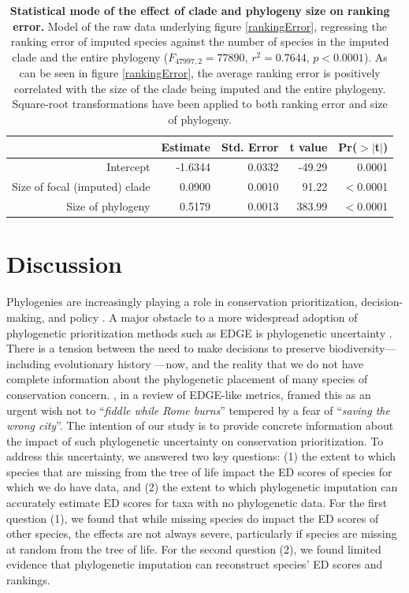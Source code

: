 \documentclass[10pt,english]{article}
\begin{document}
\begin{table}[ht]
  \centering
  \begin{tabular}{rrrrr}
    \hline
   & Estimate & Std. Error & t value & Pr($>$$|$t$|$) \\ \hline
    Intercept & -1.6344 & 0.0332 & -49.29 & 0.0001 \\
    Size of focal (imputed) clade & 0.0900 & 0.0010 & 91.22 & $<$0.0001 \\
    Size of phylogeny & 0.5179 & 0.0013 & 383.99 & $<$0.0001 \\ \hline
  \end{tabular}
  \caption{\textbf{Statistical mode of the effect of clade and
      phylogeny size on ranking error.} Model of the raw data
    underlying figure \ref{rankingError}, regressing the ranking error
    of imputed species against the number of species in the imputed
    clade and the entire phylogeny ($F_{47997,2} = 77890$, $r^2 =
    0.7644$, $p <
    0.0001$). As can be seen in figure \ref{rankingError}, the average
    ranking error is positively correlated with the size of the clade
    being imputed and the entire phylogeny.  Square-root
    transformations have been applied to both ranking error and size
    of phylogeny.}
  \label{impute_rank}
\end{table}

\clearpage
\section*{Discussion}
Phylogenies are increasingly playing a role in conservation prioritization,
decision-making, and policy \autocite{Vezquez1998}. A major obstacle to a more
widespread adoption of phylogenetic prioritization methods such as EDGE is
phylogenetic uncertainty \autocite{Collen2015}. There is a tension between the
need to make decisions to preserve biodiversity---including evolutionary history
---now, and the reality that we do not have complete information about the
phylogenetic placement of many species of conservation concern.
\textcite{Isaac2018}, in a review of EDGE-like metrics, framed this as an urgent
wish not to ``\emph{fiddle while Rome burns}'' tempered by a fear of
``\emph{saving the wrong city}''. The intention of our study is to provide
concrete information about the impact of such phylogenetic uncertainty on
conservation prioritization. To address this uncertainty, we answered two key
questions: (1) the extent to which species that are missing from the tree of
life impact the ED scores of species for which we do have data, and (2) the
extent to which phylogenetic imputation can accurately estimate ED scores for
taxa with no phylogenetic data. For the first question (1), we found that while
missing species do impact the ED scores of other species, the effects are not
always severe, particularly if species are missing at random from the tree of
life. For the second question (2), we found limited evidence that phylogenetic
imputation can reconstruct species' ED scores and rankings.
\end{document}
